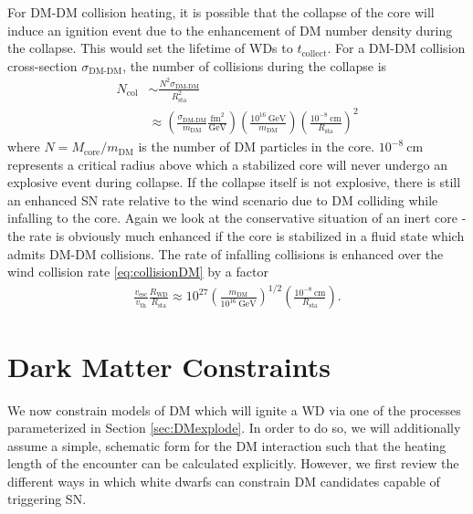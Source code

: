 \documentclass[twocolumn, preprintnumbers,amsmath,amssymb,prd, superscriptaddress]{revtex4}
\newcommand{\GeV}{\text{GeV}}
\def\r{\right)}
\def\l{\left(}
\begin{document}
For DM-DM collision heating, it is possible that the collapse of the core will induce an ignition event due to the enhancement of DM number density during the collapse.
This would set the lifetime of WDs to $t_\text{collect}$.
For a DM-DM collision cross-section $\sigma_\text{DM-DM}$, the number of collisions during the collapse is
\begin{align}
  N_\text{col} &\sim \frac{N^2 \sigma_\text{DM-DM}}{R_\text{sta}^2} \\
  &\approx \l \frac{\sigma_\text{DM-DM}}{m_\text{DM}}
  \frac{\text{fm}^2}{\GeV} \r
  \l \frac{10^{16}~\GeV}{m_\text{DM}} \r
  \l \frac{10^{-8}~\text{cm}}{R_\text{sta}} \r^2 \nonumber
\end{align}
where $N = M_\text{core}/m_\text{DM}$ is the number of DM particles in the core.
$10^{-8}~\text{cm}$ represents a critical radius above which a stabilized core will never undergo an explosive event during collapse.
If the collapse itself is not explosive, there is still an enhanced SN rate relative to the wind scenario due to DM colliding while infalling to the core. Again we look at the conservative situation of an inert core - the rate is obviously much enhanced if the core is stabilized in a fluid state which admits DM-DM collisions.
The rate of infalling collisions is enhanced over the wind collision rate \eqref{eq:collisionDM} by a factor
\begin{align}
  \frac{v_\text{esc}}{v_\text{th}} \frac{R_\text{WD}}{R_\text{sta}}
  \approx 10^{27} \l \frac{m_\text{DM}}{10^{16}~\GeV} \r^{1/2}
  \l \frac{10^{-8}~\text{cm}}{R_\text{sta}} \r.
\end{align}


\section{Dark Matter Constraints}
\label{sec:Constraints}

We now constrain models of DM which will ignite a WD via one of the processes parameterized in Section \ref{sec:DMexplode}.
In order to do so, we will additionally assume a simple, schematic form for the DM interaction such that the heating length of the encounter can be calculated explicitly.
However, we first review the different ways in which white dwarfs can constrain DM candidates capable of triggering SN.
\end{document}
